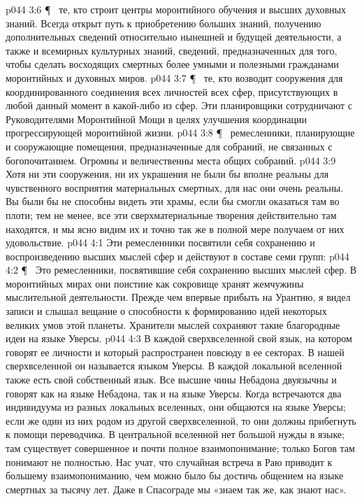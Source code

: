 \vs p044 3:6 \P\ \bibnobreakspace {} те, кто строит центры моронтийного обучения и высших духовных знаний. Всегда открыт путь к приобретению больших знаний, получению дополнительных сведений относительно нынешней и будущей деятельности, а также и всемирных культурных знаний, сведений, предназначенных для того, чтобы сделать восходящих смертных более умными и полезными гражданами моронтийных и духовных миров.
\vs p044 3:7 \P\ \bibnobreakspace {} те, кто возводит сооружения для координированного соединения всех личностей всех сфер, присутствующих в любой данный момент в какой\hyp{}либо из сфер. Эти планировщики сотрудничают с Руководителями Моронтийной Мощи в целях улучшения координации прогрессирующей моронтийной жизни.
\vs p044 3:8 \P\ \bibnobreakspace {} ремесленники, планирующие и сооружающие помещения, предназначенные для собраний, не связанных с богопочитанием. Огромны и величественны места общих собраний.
\vs p044 3:9 Хотя ни эти сооружения, ни их украшения не были бы вполне реальны для чувственного восприятия материальных смертных, для нас они очень реальны. Вы были бы не способны видеть эти храмы, если бы смогли оказаться там во плоти; тем не менее, все эти сверхматериальные творения действительно там находятся, и мы ясно видим их и точно так же в полной мере получаем от них удовольствие.
\vs p044 4:1 Эти ремесленники посвятили себя сохранению и воспроизведению высших мыслей сфер и действуют в составе семи групп:
\vs p044 4:2 \P\ \bibnobreakspace {} Это ремесленники, посвятившие себя сохранению высших мыслей сфер. В моронтийных мирах они поистине как сокровище хранят жемчужины мыслительной деятельности. Прежде чем впервые прибыть на Урантию, я видел записи и слышал вещание о способности к формированию идей некоторых великих умов этой планеты. Хранители мыслей сохраняют такие благородные идеи на языке Уверсы.
\vs p044 4:3 В каждой сверхвселенной свой язык, на котором говорят ее личности и который распространен повсюду в ее секторах. В нашей сверхвселенной он называется языком Уверсы. В каждой локальной вселенной также есть свой собственный язык. Все высшие чины Небадона двуязычны и говорят как на языке Небадона, так и на языке Уверсы. Когда встречаются два индивидуума из разных локальных вселенных, они общаются на языке Уверсы; если же один из них родом из другой сверхвселенной, то они должны прибегнуть к помощи переводчика. В центральной вселенной нет большой нужды в языке; там существует совершенное и почти полное взаимопонимание; только Богов там понимают не полностью. Нас учат, что случайная встреча в Раю приводит к большему взаимопониманию, чем можно было бы достичь общением на языке смертных за тысячу лет. Даже в Спасограде мы «знаем так же, как знают нас».
